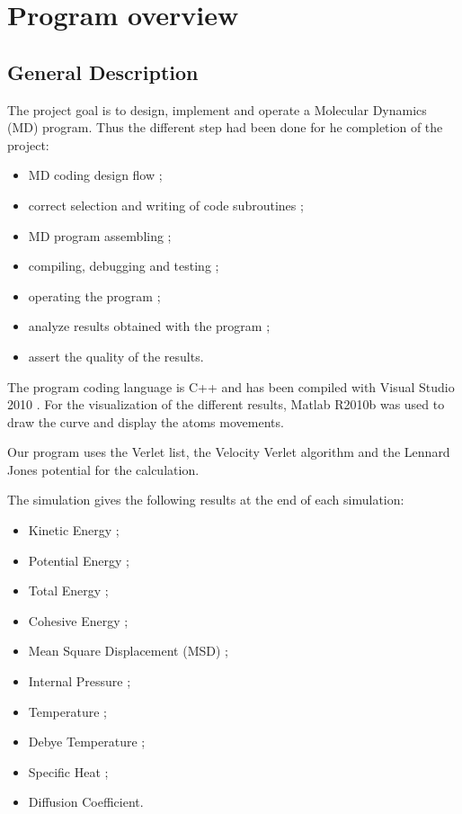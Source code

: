 \section{Program overview}

\subsection{General Description}

The project goal is to design, implement and operate a Molecular Dynamics (MD) program. Thus the different step had been done for he completion of the project:

\begin{itemize}
\item MD coding design flow ; 
\item correct selection and writing of code subroutines ;
\item MD program assembling ;
\item compiling, debugging and testing ;
\item operating the program ;
\item analyze results obtained with the program ;
\item assert the quality of the results.
\end{itemize}

The program coding language is C++ and has been compiled with Visual Studio 2010 \textregistered. For the visualization of the different results, Matlab R2010b \textregistered was used to draw the curve and display the atoms movements.

Our program uses the Verlet list, the Velocity Verlet algorithm and the Lennard Jones potential for the calculation.

The simulation gives the following results at the end of each simulation:

\begin{itemize}
\item Kinetic Energy ;
\item Potential Energy ;
\item Total Energy ;
\item Cohesive Energy ;
\item Mean Square Displacement (MSD) ;
\item Internal Pressure ; 
\item Temperature ; 
\item Debye Temperature ; 
\item Specific Heat ; 
\item Diffusion Coefficient.
\end{itemize}

